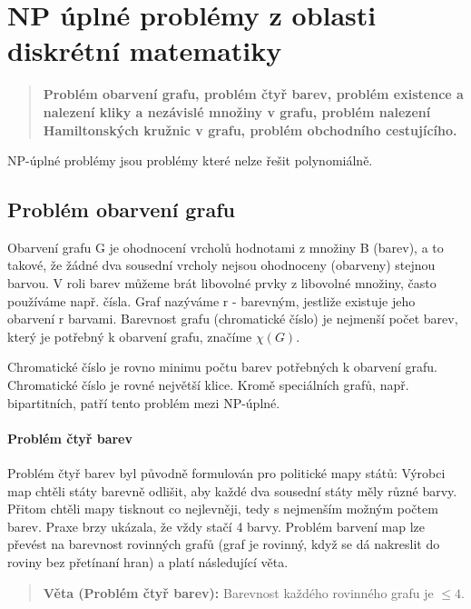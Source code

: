\section{NP úplné problémy z oblasti diskrétní matematiky}
\begin{quote}
\textbf{Problém obarvení grafu, problém čtyř barev, problém existence a nalezení kliky a nezávislé množiny v grafu, problém nalezení Hamiltonských kružnic v grafu, problém obchodního cestujícího.}
\end{quote}
NP-úplné problémy jsou problémy které nelze řešit polynomiálně.

\subsection{Problém obarvení grafu}
Obarvení grafu G je ohodnocení vrcholů hodnotami z množiny B 
(barev), a to takové, že žádné dva sousední vrcholy nejsou 
ohodnoceny (obarveny) stejnou barvou. V roli barev můžeme brát 
libovolné prvky z libovolné množiny, často používáme např. čísla.
Graf nazýváme r - barevným, jestliže existuje jeho obarvení r 
barvami. Barevnost grafu (chromatické číslo) je nejmenší počet 
barev, který je potřebný k obarvení grafu, značíme $\chi(G)$.

Chromatické číslo je rovno minimu počtu barev potřebných k 
obarvení grafu. Chromatické číslo je rovné největší klice.
Kromě speciálních grafů, např. bipartitních, patří 
tento problém mezi NP-úplné.

\paragraph*{Problém čtyř barev}
Problém čtyř barev byl původně formulován pro politické mapy států: Výrobci map chtěli
státy barevně odlišit, aby každé dva sousední státy měly různé barvy. Přitom chtěli mapy
tisknout co nejlevněji, tedy s nejmenším možným počtem barev. Praxe brzy ukázala, že
vždy stačí 4 barvy. Problém barvení map lze převést na 
barevnost rovinných grafů (graf je rovinný, když se dá 
nakreslit do roviny bez přetínaní hran) a platí následující 
věta.

\begin{quote}
    \textbf{Věta (Problém čtyř barev):} Barevnost každého rovinného grafu je $\leq 4$.
\end{quote}

